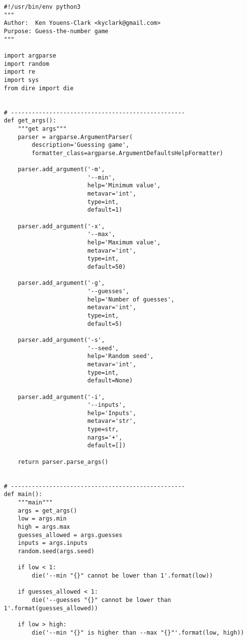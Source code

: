 \documentclass[]{article}
\begin{document}
\begin{verbatim}
#!/usr/bin/env python3
"""
Author:  Ken Youens-Clark <kyclark@gmail.com>
Purpose: Guess-the-number game
"""

import argparse
import random
import re
import sys
from dire import die


# --------------------------------------------------
def get_args():
    """get args"""
    parser = argparse.ArgumentParser(
        description='Guessing game',
        formatter_class=argparse.ArgumentDefaultsHelpFormatter)

    parser.add_argument('-m',
                        '--min',
                        help='Minimum value',
                        metavar='int',
                        type=int,
                        default=1)

    parser.add_argument('-x',
                        '--max',
                        help='Maximum value',
                        metavar='int',
                        type=int,
                        default=50)

    parser.add_argument('-g',
                        '--guesses',
                        help='Number of guesses',
                        metavar='int',
                        type=int,
                        default=5)

    parser.add_argument('-s',
                        '--seed',
                        help='Random seed',
                        metavar='int',
                        type=int,
                        default=None)

    parser.add_argument('-i',
                        '--inputs',
                        help='Inputs',
                        metavar='str',
                        type=str,
                        nargs='+',
                        default=[])

    return parser.parse_args()


# --------------------------------------------------
def main():
    """main"""
    args = get_args()
    low = args.min
    high = args.max
    guesses_allowed = args.guesses
    inputs = args.inputs
    random.seed(args.seed)

    if low < 1:
        die('--min "{}" cannot be lower than 1'.format(low))

    if guesses_allowed < 1:
        die('--guesses "{}" cannot be lower than 1'.format(guesses_allowed))

    if low > high:
        die('--min "{}" is higher than --max "{}"'.format(low, high))


\end{verbatim}
\end{document}
